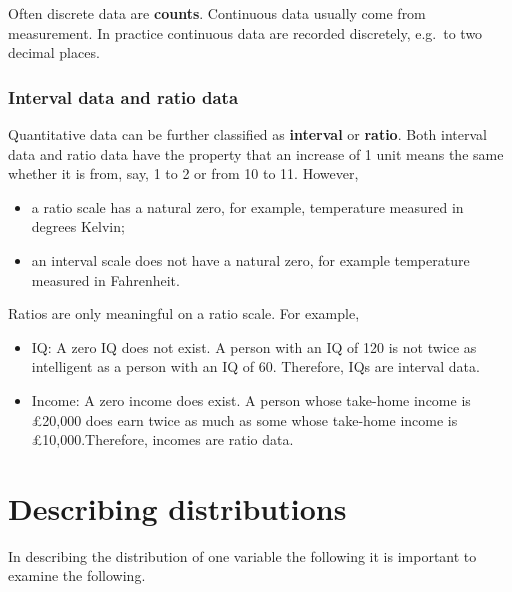 \documentclass[
  11pt,
  british,
  openany, a4paper]{book}
\providecommand{\tightlist}{%
  \setlength{\itemsep}{0pt}\setlength{\parskip}{0pt}}
\begin{document}
Often discrete data are \textbf{counts}. Continuous data usually come from measurement. In practice continuous data are recorded discretely, e.g.~to two decimal places.

\hypertarget{interval-data-and-ratio-data}{%
\subsubsection*{Interval data and ratio data}\label{interval-data-and-ratio-data}}

Quantitative data can be further classified as \textbf{interval} or \textbf{ratio}. Both interval data and ratio data have the property that an increase of 1 unit means the same whether it is from, say, 1 to 2 or from 10 to 11. However,

\begin{itemize}
\tightlist
\item
  a ratio scale has a natural zero, for example, temperature measured in degrees Kelvin;
\item
  an interval scale does not have a natural zero, for example temperature
  measured in Fahrenheit.
\end{itemize}

Ratios are only meaningful on a ratio scale. For example,

\begin{itemize}
\tightlist
\item
  IQ: A zero IQ does not exist. A person with an IQ of 120 is not twice as intelligent as a person with an IQ of 60. Therefore, IQs are interval data.
\item
  Income: A zero income does exist. A person whose take-home income is \pounds 20,000 does earn twice as much as some whose take-home income is \pounds 10,000.Therefore, incomes are ratio data.
\end{itemize}

\hypertarget{describing-distributions}{%
\section{Describing distributions}\label{describing-distributions}}

In describing the distribution of one variable the following it is important to
examine the following.
\end{document}

